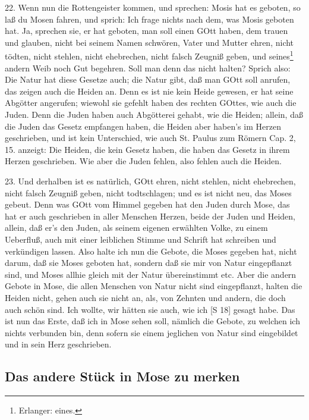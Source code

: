 22. Wenn nun die Rottengeister kommen, und sprechen: Mosis hat es geboten, so laß du Mosen fahren, und sprich: Ich frage nichts nach dem, was Mosis geboten hat. Ja, sprechen sie, er hat geboten, man soll einen GOtt haben, dem trauen und glauben, nicht bei seinem Namen schwören, Vater und Mutter ehren, nicht tödten, nicht stehlen, nicht ehebrechen, nicht falsch Zeugniß geben, und seines\footnote{Erlanger: eines.} andern Weib noch Gut begehren. Soll man denn das nicht halten? Sprich also: Die Natur hat diese Gesetze auch; die Natur gibt, daß man GOtt soll anrufen, das zeigen auch die Heiden an. Denn es ist nie kein Heide gewesen, er hat seine Abgötter angerufen; wiewohl sie gefehlt haben des rechten GOttes, wie auch die Juden. Denn die Juden haben auch Abgötterei gehabt, wie die Heiden; allein, daß die Juden das Gesetz empfangen haben, die Heiden aber haben’s im Herzen geschrieben, und ist kein Unterschied, wie auch St. Paulus zum Römern Cap. 2, 15. anzeigt: Die Heiden, die kein Gesetz haben, die haben das Gesetz in ihrem Herzen geschrieben. Wie aber die Juden fehlen, also fehlen auch die Heiden.

23. Und derhalben ist es natürlich, GOtt ehren, nicht stehlen, nicht ehebrechen, nicht falsch Zeugniß geben, nicht todtschlagen; und es ist nicht neu, das Moses gebeut. Denn was GOtt vom Himmel gegeben hat den Juden durch Mose, das hat er auch geschrieben in aller Menschen Herzen, beide der Juden und Heiden, allein, daß er’s den Juden, als seinem eigenen erwählten Volke, zu einem Ueberfluß, auch mit einer leiblichen Stimme und Schrift hat schreiben und verkündigen lassen. Also halte ich nun die Gebote, die Moses gegeben hat, nicht darum, daß sie Moses geboten hat, sondern daß sie mir von Natur eingepflanzt sind, und Moses allhie gleich mit der Natur übereinstimmt etc. Aber die andern Gebote in Mose, die allen Menschen von Natur nicht sind eingepflanzt, halten die Heiden nicht, gehen auch sie nicht an, als, von Zehnten und andern, die doch auch schön sind. Ich wollte, wir hätten sie auch, wie ich [S 18] gesagt habe. Das ist nun das Erste, daß ich in Mose sehen soll, nämlich die Gebote, zu welchen ich nichts verbunden bin, denn sofern sie einem jeglichen von Natur sind eingebildet und in sein Herz geschrieben.

\subsection{Das andere Stück in Mose zu merken}

